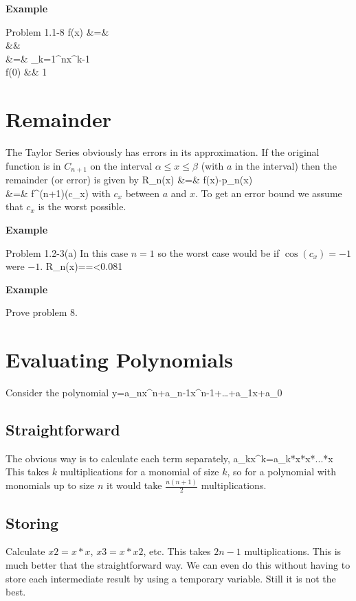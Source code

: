 \textbf{Example}

Problem 1.1-8
\beqn
f(x) &=&  \\
&\approx &  \\
&=& \sum_{k=1}^nx^{k-1} \\
f(0) &\approx & 1
\eeqn


\section{Remainder}
The Taylor Series obviously has errors in its approximation.  If the
original function is in $C_{n+1}$ on the interval $\alpha\leq x\leq\beta$ (with $a$ in the
interval) then the remainder (or error) is given by
\beqn
R_n(x) &=& f(x)-p_n(x) \\
&=& f^{(n+1)}(c_x)
\eeqn
with $c_x$ between $a$ and $x$.  To get an error bound we assume that $c_x$ is the worst possible.

\textbf{Example}

Problem 1.2-3(a)
In this case $n=1$ so the worst case would be if $\cos(c_x)=-1$ were $-1$.
\beqn
R_n(x)==\leq{}<0.081
\eeqn

\textbf{Example}

Prove problem 8.


\section{Evaluating Polynomials}

Consider the polynomial
\beqn
y=a_nx^n+a_{n-1}x^{n-1}+\ldots+a_1x+a_0
\eeqn

\subsection{Straightforward}
The obvious way is to calculate each term separately,
\beqn
a_kx^k=a_k*x*x*...*x
\eeqn
This takes $k$ multiplications for a monomial of size $k$, so for a polynomial with monomials up to size $n$ it would take $\frac{n(n+1)}{2}$ multiplications.

\subsection{Storing}
Calculate $x2=x*x$, $x3=x*x2$, etc. This takes $2n-1$ multiplications.  This is much better that the straightforward way.  We can even do this without having to store each intermediate result by using a temporary variable.  Still it is not the best.

